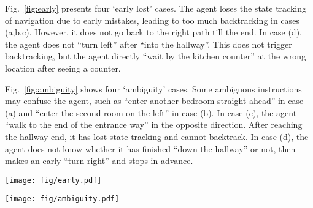 Fig.~\ref{fig:early} presents four `early lost' cases. 
The agent loses the state tracking of navigation due to early mistakes, leading to too much backtracking in cases (a,b,c). 
However, it does not go back to the right path till the end. 
In case (d), the agent does not ``turn left'' after ``into the hallway''. This does not trigger backtracking, but the agent directly ``wait by the kitchen counter'' at the wrong location after seeing a counter.

Fig.~\ref{fig:ambiguity} shows four `ambiguity' cases. 
Some ambiguous instructions may confuse the agent, such as ``enter another bedroom straight ahead'' in case (a) and ``enter the second room on the left'' in case (b). 
In case (c), the agent ``walk to the end of the entrance way'' in the opposite direction. After reaching the hallway end, it has lost state tracking and cannot backtrack. 
In case (d), the agent does not know whether it has finished ``down the hallway'' or not, then makes an early ``turn right'' and stops in advance.
\begin{figure*}[h]
\centering
\texttt{[image: fig/early.pdf]}
\vspace{-3mm}
\caption{
Failure cases of `early lost' in val unseen splits of R2R. Yellow and green circles denote the start and target locations, respectively, and the red circles represent incorrect endpoints. 
}\label{fig:early}
\end{figure*}
\begin{figure*}[h]
\centering
\texttt{[image: fig/ambiguity.pdf]}
\vspace{-3mm}
\caption{
Failure cases of `ambiguity' in val unseen splits of R2R. Yellow and green circles denote the start and target locations, respectively, and the red circles represent incorrect endpoints. 
}\label{fig:ambiguity}
\end{figure*}
